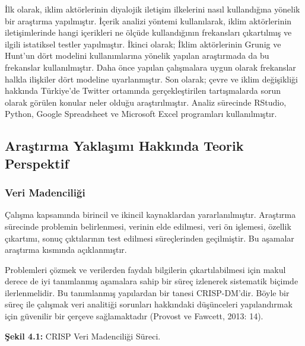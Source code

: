 \documentclass[
]{book}
\begin{document}
İlk olarak, iklim aktörlerinin diyalojik iletişim ilkelerini nasıl kullandığına yönelik bir araştırma yapılmıştır. İçerik analizi yöntemi kullanılarak, iklim aktörlerinin iletişimlerinde hangi içerikleri ne ölçüde kullandığının frekansları çıkartılmış ve ilgili istatiksel testler yapılmıştır. İkinci olarak; İklim aktörlerinin Grunig ve Hunt'un dört modelini kullanımlarına yönelik yapılan araştırmada da bu frekanslar kullanılmıştır. Daha önce yapılan çalışmalara uygun olarak frekanslar halkla ilişkiler dört modeline uyarlanmıştır. Son olarak; çevre ve iklim değişikliği hakkında Türkiye'de Twitter ortamında gerçekleştirilen tartışmalarda sorun olarak görülen konular neler olduğu araştırılmıştır. Analiz sürecinde RStudio, Python, Google Spreadsheet ve Microsoft Excel programları kullanılmıştır.

\hypertarget{araux15ftux131rma-yaklaux15fux131mux131-hakkux131nda-teorik-perspektif}{%
\subsection{Araştırma Yaklaşımı Hakkında Teorik Perspektif}\label{araux15ftux131rma-yaklaux15fux131mux131-hakkux131nda-teorik-perspektif}}

\hypertarget{veri-madenciliux11fi}{%
\subsubsection{Veri Madenciliği}\label{veri-madenciliux11fi}}

Çalışma kapsamında birincil ve ikincil kaynaklardan yararlanılmıştır. Araştırma sürecinde problemin belirlenmesi, verinin elde edilmesi, veri ön işlemesi, özellik çıkartımı, sonuç çıktılarının test edilmesi süreçlerinden geçilmiştir. Bu aşamalar araştırma kısmında açıklanmıştır.

Problemleri çözmek ve verilerden faydalı bilgilerin çıkartılabilmesi için makul derece de iyi tanımlanmış aşamalara sahip bir süreç izlenerek sistematik biçimde ilerlenmelidir. Bu tanımlanmış yapılardan bir tanesi CRISP-DM'dir. Böyle bir süreç ile çalışmak veri analitiği sorunları hakkındaki düşünceleri yapılandırmak için güvenilir bir çerçeve sağlamaktadır (Provost ve Fawcett, 2013: 14).

\textbf{Şekil 4.1:} CRISP Veri Madenciliği Süreci.
\end{document}

